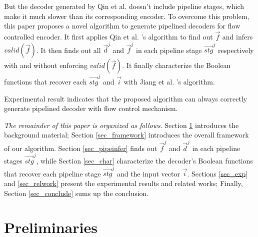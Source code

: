 \documentclass[runningheads,a4paper,orivec]{llncs}
\begin{document}
But the decoder generated by Qin et al. \cite{QinTODAES15} doesn't include pipeline stages,
which make it much slower than its corresponding encoder.
To overcome this problem,
this paper proposes a novel algorithm to generate pipelined decoders for flow controlled encoder.
It first applies Qin et al. \cite{QinTODAES15}'s algorithm to find out $\vec{f}$ and infers $valid(\vec{f})$.
It then finds out all $\vec{d}^j$ and $\vec{f}^j$ in each pipeline stage $\vec{stg}^j$ respectively with and without enforcing $valid(\vec{f})$.
It finally characterize the Boolean functions that recover each $\vec{stg}^j$ and $\vec{i}$ with 
Jiang et al. \cite{InterpBoolFunction}'s algorithm.

Experimental result indicates that the proposed algorithm can always 
correctly generate pipelined decoder with flow control mechanism.

\emph{The remainder of this paper is organized as follows}.
Section \ref{sec_prem} introduces the background material;
Section \ref{sec_framework} introduces the overall framework of our algorithm.
Section \ref{sec_pipeinfer} finds out $\vec{f}^j$ and $\vec{d}^j$ in each pipeline stages $\vec{stg}^j$,
while Section \ref{sec_char} characterize the decoder's Boolean functions that recover each pipeline stage $\vec{stg}^j$ and the input vector $\vec{i}$.
Sections \ref{sec_exp} and \ref{sec_relwork} present the experimental results and related works;
Finally,
Section \ref{sec_conclude} sums up the conclusion.

\section{Preliminaries}\label{sec_prem}

\end{document}
